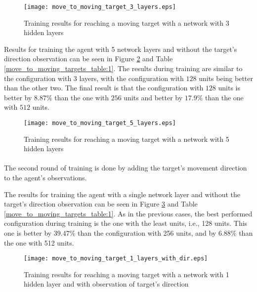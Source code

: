 \begin{figure}
    \begin{center}
        \texttt{[image: move\_to\_moving\_target\_3\_layers.eps]}
        \caption{Training results for reaching a moving target with a network with 3 hidden layers}
        \label{train_results_moving_3_layers}
    \end{center}
\end{figure}


Results for training the agent with 5 network layers and without the target's direction observation can be seen in Figure \ref{train_results_moving_5_layers} and Table \ref{move_to_moving_targets_table:1}. The results during training are similar to the configuration with 3 layers, with the configuration with $128$ units being better than the other two. The final result is that the configuration with $128$ units is better by $8.87\%$ than the one with $256$ units and better by $17.9\%$ than the one with $512$ units.

\begin{figure}
    \begin{center}
        \texttt{[image: move\_to\_moving\_target\_5\_layers.eps]}
        \caption{Training results for reaching a moving target with a network with 5 hidden layers}
        \label{train_results_moving_5_layers}
    \end{center}
\end{figure}


\paragraph{}
The second round of training is done by adding the target's movement direction to the agent's observations.

The results for training the agent with a single network layer and without the target's direction observation can be seen in Figure \ref{train_results_moving_1_layers_with_dir} and Table \ref{move_to_moving_targets_table:1}. As in the previous cases, the best performed configuration during training is the one with the least units, i.e., 128 units. This one is better by $39.47\%$ than the configuration with 256 units, and by $6.88\%$ than the one with 512 units.

\begin{figure}
    \begin{center}
        \texttt{[image: move\_to\_moving\_target\_1\_layers\_with\_dir.eps]}
        \caption{Training results for reaching a moving target with a network with 1 hidden layer and with observation of target's direction}
        \label{train_results_moving_1_layers_with_dir}
    \end{center}
\end{figure}

